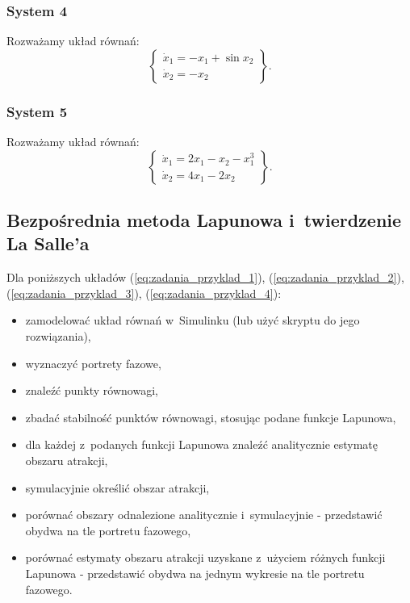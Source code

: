\documentclass{sprawozdanie-agh}
\begin{document}
        \subsubsection{System 4}
        Rozważamy układ równań:
        \begin{equation}
            \label{eq:posrednia_4}
            \left\{
            \begin{array}{l}
                 \dot{x}_{1} = -x_{1} + \sin{x_{2}}\\
                 \dot{x}_{2} = -x_{2}
            \end{array}
            \right\}.
        \end{equation}

        \subsubsection{System 5}
        Rozważamy układ równań:
        \begin{equation}
            \label{eq:posrednia_5}
            \left\{
            \begin{array}{l}
                 \dot{x}_{1} = 2x_{1} - x_{2} - x_{1}^{3}\\
                 \dot{x}_{2} = 4x_{1} - 2x_{2}
            \end{array}
            \right\}.
        \end{equation}

    \subsection{Bezpośrednia metoda Lapunowa i~twierdzenie La Salle'a}
    Dla poniższych układów (\ref{eq:zadania_przyklad_1}), (\ref{eq:zadania_przyklad_2}), (\ref{eq:zadania_przyklad_3}), (\ref{eq:zadania_przyklad_4}):
    \begin{itemize}
        \item zamodelować układ równań w~Simulinku (lub użyć skryptu do jego rozwiązania),
        \item wyznaczyć portrety fazowe,
        \item znaleźć punkty równowagi,
        \item zbadać stabilność punktów równowagi, stosując podane funkcje Lapunowa,
        \item dla każdej z~podanych funkcji Lapunowa znaleźć analitycznie estymatę obszaru atrakcji,
        \item symulacyjnie określić obszar atrakcji,
        \item porównać obszary odnalezione analitycznie i~symulacyjnie - przedstawić obydwa na tle portretu fazowego,
        \item porównać estymaty obszaru atrakcji uzyskane z~użyciem różnych funkcji Lapunowa - przedstawić obydwa na jednym wykresie na tle portretu fazowego.
    \end{itemize}
\end{document}
